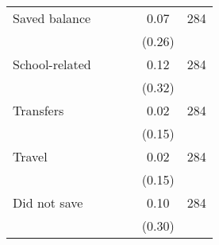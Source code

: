 \begin{table}[h]
{\begin{threeparttable}
\begin{tabular}{l*{5}{c}}
Saved balance&         &         &         &     0.07&      284\\
          &         &         &         &   (0.26)&         \\
School-related&         &         &         &     0.12&      284\\
          &         &         &         &   (0.32)&         \\
Transfers &         &         &         &     0.02&      284\\
          &         &         &         &   (0.15)&         \\
Travel    &         &         &         &     0.02&      284\\
          &         &         &         &   (0.15)&         \\
Did not save&         &         &         &     0.10&      284\\
          &         &         &         &   (0.30)&         \\
\bottomrule \end{tabular} \begin{tablenotes}[flushleft] \footnotesize \item  \end{tablenotes} \end{threeparttable} } \end{table}

